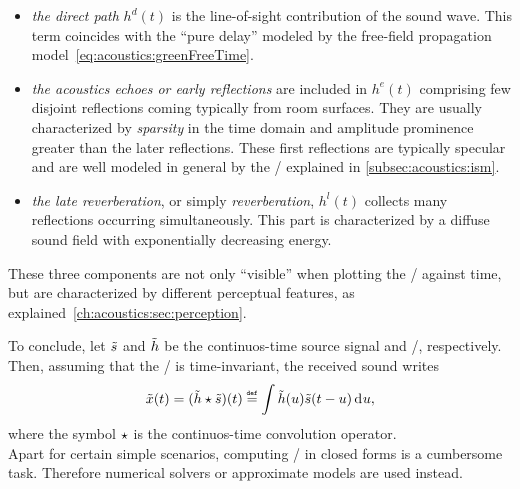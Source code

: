 \begin{itemize}
    \item \textit{the direct path} $h^d(t)$ is the line-of-sight contribution of the sound wave.
    This term coincides with the ``pure delay'' modeled by the free-field propagation model~\eqref{eq:acoustics:greenFreeTime}.

    \item \textit{the acoustics echoes or early reflections} are included in $h^e(t)$ comprising few disjoint reflections coming typically from room surfaces.
    They are usually characterized by \textit{sparsity} in the time domain and amplitude prominence greater than the later reflections.
    These first reflections are typically specular and are well modeled in general by the \ISMdef/ explained in \cref{subsec:acoustics:ism}.

    \item \textit{the late reverberation}, or simply \textit{reverberation}, $h^l(t)$ collects many reflections occurring simultaneously.
    This part is characterized by a diffuse sound field with exponentially decreasing energy.
\end{itemize}
These three components are not only ``visible'' when plotting the \RIR/ against time,
but are characterized by different perceptual features, as explained~\cref{ch:acoustics:sec:perception}.

\mynewline
To conclude, let $\tilde{s}$ and $\tilde{h}$ be the continuos-time source signal and \RIR/, respectively.
Then, assuming that the \RIR/ is time-invariant, the received sound writes
\begin{equation}
    \tilde{\mic}(t) = (\tilde{\rir} \convCont \tilde{\src})(t) \eqdef \int \tilde{\rir}(u) \tilde{\src}(t - u) \kdiff{u}
    ,
\end{equation}
where the symbol $\star$ is the continuos-time convolution operator.
\\Apart for certain simple scenarios, computing \RIRs/ in closed forms is a cumbersome task.
Therefore numerical solvers or approximate models are used instead.

